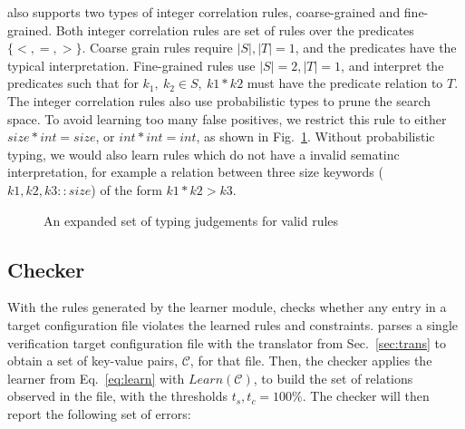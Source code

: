\app also supports two types of integer correlation rules, coarse-grained and fine-grained.
Both integer correlation rules are set of rules over the predicates $\{<,=,>\}$.
Coarse grain rules require $|S|, |T| = 1$, and the predicates have the typical interpretation.
Fine-grained rules use $|S|=2,|T|=1$, and interpret the predicates such that for $k_1,\ k_2 \in S,\ k1*k2$ must have the predicate relation to $T$.
The integer correlation rules also use probabilistic types to prune the search space.
To avoid learning too many false positives, we restrict this rule to either $size*int=size$, or $int*int = int$, as shown in Fig.~\ref{fig:allrules}.
Without probabilistic typing, we would also learn rules which do not have a invalid sematinc interpretation, for example a relation between three size keywords ($k1,k2,k3::size$) of the form $k1*k2>k3$.

{
\setlength{\abovecaptionskip}{-.05pt}
\setlength{\belowcaptionskip}{-15pt}
\begin{figure}
\caption{An expanded set of typing judgements for valid rules}
\label{fig:allrules}
\end{figure}
}

\subsection{Checker}
\label{sec-checker}

With the rules generated by the learner module, \app checks whether any entry in a target configuration file violates the learned rules and constraints.
\app parses a single verification target configuration file with the translator from Sec.~\ref{sec:trans}  to obtain a set of key-value pairs, $\mathcal{C}$, for that file.
Then, the checker applies the learner from Eq.~\ref{eq:learn} with $\textit{Learn}(\mathcal{C})$,
  to build the set of relations observed in the file, with the thresholds $t_s,t_c = 100\%$. 
The checker will then report the following set of errors:

